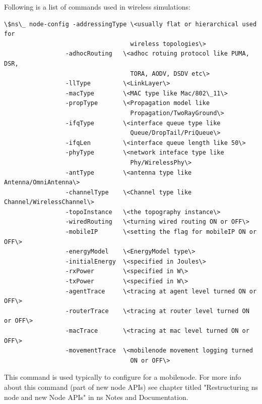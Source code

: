 Following is a list of commands used in wireless simulations:
\begin{verbatim}
\$ns\_ node-config -addressingType \<usually flat or hierarchical used for 
                                   wireless topologies\>
                 -adhocRouting   \<adhoc rotuing protocol like PUMA, DSR,
                                   TORA, AODV, DSDV etc\>
                 -llType         \<LinkLayer\>
                 -macType        \<MAC type like Mac/802\_11\>
                 -propType       \<Propagation model like
                                   Propagation/TwoRayGround\>
                 -ifqType        \<interface queue type like
                                   Queue/DropTail/PriQueue\>
                 -ifqLen         \<interface queue length like 50\>
                 -phyType        \<network inteface type like
                                   Phy/WirelessPhy\>
                 -antType        \<antenna type like Antenna/OmniAntenna\>
                 -channelType    \<Channel type like Channel/WirelessChannel\>
                 -topoInstance   \<the topography instance\>
                 -wiredRouting   \<turning wired routing ON or OFF\>
                 -mobileIP       \<setting the flag for mobileIP ON or OFF\>
                 -energyModel    \<EnergyModel type\>
                 -initialEnergy  \<specified in Joules\>
                 -rxPower        \<specified in W\>
                 -txPower        \<specified in W\>
                 -agentTrace     \<tracing at agent level turned ON or OFF\>
                 -routerTrace    \<tracing at router level turned ON or OFF\>
                 -macTrace       \<tracing at mac level turned ON or OFF\>
                 -movementTrace  \<mobilenode movement logging turned
                                   ON or OFF\>
\end{verbatim}
This command is used typically to configure for a mobilenode. For more info
about this command (part of new node APIs) see chapter titled "Restructuring
ns node and new Node APIs" in ns Notes and Documentation.

